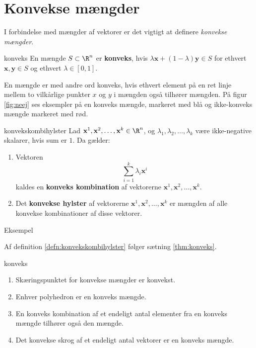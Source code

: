 \section{Konvekse mængder}
%
I forbindelse med mængder af vektorer er det vigtigt at definere \textit{konvekse mængder}.
%
\begin{defn}{}{konveks}
En mængde $S \subset \R^n$ er \textbf{konveks}, hvis $\lambda \textbf{x} + (1- \lambda ) \textbf{y} \in S$ for ethvert $\textbf{x}, \textbf{y} \in S$ og ethvert $\lambda \in [0,1]$. 
\end{defn}
\noindent
%
En mængde er med andre ord konveks, hvis ethvert element på en ret linje mellem to vilkårlige punkter $x$ og $y$ i mængden også tilhører mængden. 
På figur \ref{fig:neej} ses eksempler på en konveks mængde, markeret med blå og ikke-konveks mængde markeret med rød. 
%

%
\begin{defn}{}{konvekskombihylster}
Lad $\textbf{x}^1, \textbf{x}^2, \ldots, \textbf{x}^k \in \R^n$, og $\lambda_1, \lambda_2, \ldots, \lambda_k$ være ikke-negative skalarer, hvis sum er $1$. Da gælder:
%
\begin{enumerate}[label=(\alph*)]
	\item Vektoren $$\sum_{i=1}^{k} \lambda_i \textbf{x}^i$$ kaldes en \textbf{konveks kombination} af vektorerne $\textbf{x}^1, \textbf{x}^2, \ldots, \textbf{x}^k$. 
	\item Det \textbf{konvekse hylster} af vektorerne $\textbf{x}^1, \textbf{x}^2, \ldots, \textbf{x}^k$ er mængden af alle konvekse kombinationer af disse vektorer. 
\end{enumerate}
%
%
\end{defn}
%
Eksempel 
%

%
Af definition \ref{defn:konvekskombihylster} følger sætning \ref{thm:konveks}.
%
\begin{thm}{}{konveks}
\begin{enumerate}[label=(\alph*)]
	\item Skæringspunktet for konvekse mængder er konvekst. 
	\item Enhver polyhedron er en konveks mængde.
	\item En konveks kombination af et endeligt antal elementer fra en konveks mængde tilhører også den mængde. 
	\item Det konvekse skrog af et endeligt antal vektorer er en konveks mængde. 
\end{enumerate}
\end{thm}
